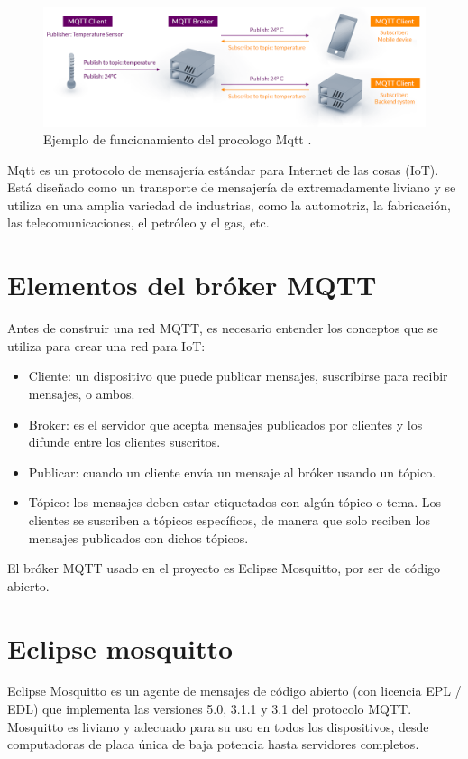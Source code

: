 \begin{itemize}
\vspace{0.5cm}

\begin{figure}[htbp]
	\centering
	\includegraphics[width=.9\textwidth]{./Figures/mqtt.png}
	\caption{Ejemplo de funcionamiento del procologo Mqtt \protect\footnotemark.}
	\label{fig:mqtt}
\end{figure}



Mqtt es un protocolo de mensajería estándar para Internet de las cosas (IoT). Está diseñado como un transporte de mensajería de extremadamente liviano y se utiliza en una amplia variedad de industrias, como la automotriz, la fabricación, las telecomunicaciones, el petróleo y el gas, etc. 
\end{itemize}

\section{Elementos del bróker MQTT}

Antes de construir una red MQTT, es necesario entender los conceptos que se utiliza para crear una red para IoT: 
\begin{itemize}
\item Cliente: un dispositivo que puede publicar mensajes, suscribirse para recibir mensajes, o ambos.
\item Broker: es el servidor que acepta mensajes publicados por clientes y los difunde entre los clientes suscritos.
\item Publicar: cuando un cliente envía un mensaje al bróker usando un tópico.
\item Tópico: los mensajes deben estar etiquetados con algún tópico o tema. Los clientes se suscriben a tópicos específicos, de manera que solo reciben los mensajes publicados con dichos tópicos. 
\end{itemize}

El bróker MQTT usado en el proyecto es Eclipse Mosquitto, por ser de código abierto.

\section{Eclipse mosquitto} 
Eclipse Mosquitto es un agente de mensajes de código abierto (con licencia EPL / EDL) que implementa las versiones 5.0, 3.1.1 y 3.1 del protocolo MQTT. Mosquitto es liviano y adecuado para su uso en todos los dispositivos, desde computadoras de placa única de baja potencia hasta servidores completos.

